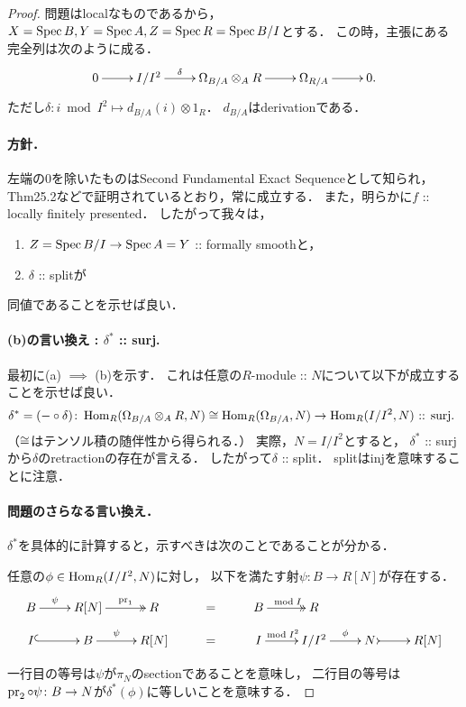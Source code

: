 \documentclass[a4paper]{jsarticle}
\begin{document}
\begin{proof}
    問題はlocalなものであるから，
    $X=\operatorname{Spec} B, Y=\operatorname{Spec} A, Z=\operatorname{Spec} R=\operatorname{Spec} B/I$とする．
    この時，主張にある完全列は次のように成る．
    \[\xymatrix{
            0 \ar[r]& I/I^2 \ar[r]^-{\delta}& \shDer_{B/A} \otimes_A R \ar[r]& \shDer_{R/A} \ar[r]& 0.
    }\]
    ただし$\delta \colon i \bmod I^2 \mapsto d_{B/A}(i) \otimes 1_R$．
    $d_{B/A}$はderivationである．

    \paragraph{方針．}
    左端の$0$を除いたものはSecond Fundamental Exact Sequenceとして知られ，
    \cite{Mat} Thm25.2などで証明されているとおり，常に成立する．
    また，明らかに$f$ :: locally finitely presented．
    したがって我々は，
    \begin{enumerate}[label=(\alph*), leftmargin=*]
        \item $Z=\operatorname{Spec} B/I \to \operatorname{Spec} A=Y$ :: formally smoothと，
        \item $\delta$ :: splitが
    \end{enumerate}
    同値であることを示せば良い．

    \paragraph{(b)の言い換え : $\delta^*$ :: surj.}
    最初に(a) $\implies$ (b)を示す．
    これは任意の$R$-module :: $N$について以下が成立することを示せば良い．
    \[
        \delta^*=(- \circ \delta) \colon
            \operatorname{Hom}_R(\Omega_{B/A} \otimes_A R, N) \cong \operatorname{Hom}_R(\Omega_{B/A}, N) \to \operatorname{Hom}_R(I/I^2, N)
            \text{ :: surj. }
    \]
    （$\cong$はテンソル積の随伴性から得られる．）
    実際，$N=I/I^2$とすると，
    $\delta^*$ :: surjから$\delta$のretractionの存在が言える．
    したがって$\delta$ :: split．
    splitはinjを意味することに注意．

    \paragraph{問題のさらなる言い換え．}
    $\delta^*$を具体的に計算すると，示すべきは次のことであることが分かる．
    \begin{Claim}
        任意の$\phi \in \operatorname{Hom}_R(I/I^2, N)$に対し，
        以下を満たす射$\psi \colon B \to R[N]$が存在する．
        \[\xymatrix@R=10pt{
                B \ar[r]^-{\psi}& R[N] \ar@{->>}[r]^-{\pr_1}& R & =
                    & B \ar@{->>}[r]^-{\bmod I}& R \\
                I \ar@{^{(}->}[r]& B \ar[r]^-{\psi}& R[N] & =
                    & I \ar[r]^-{\bmod I^2}& I/I^2 \ar[r]^-{\phi}& N \ar@{>->}[r]& R[N]
        }\]
    \end{Claim}
    一行目の等号は$\psi$が$\pi_N$のsectionであることを意味し，
    二行目の等号は$\operatorname{pr}_2 \circ \psi \colon B \to N$が$\delta^*(\phi)$に等しいことを意味する．


\end{proof}
\end{document}
